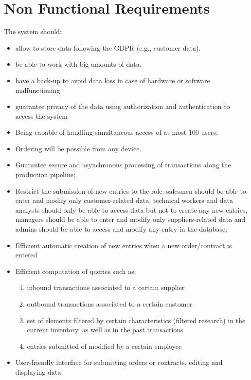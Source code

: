 \section{Non Functional Requirements}
The system should:
\begin{itemize}
    \item allow to store data following the GDPR (e.g., customer data).
    \item be able to work with big amounts of data.
    \item have a back-up to avoid data loss in case of hardware or software malfunctioning
    \item guarantee privacy of the data using authorization and authentication to access the system
    \item Being capable of handling simultaneous access of at most 100 users;
    \item Ordering will be possible from any device.
    \item Guarantee secure and asynchronous processing of transactions along the production pipeline;
    \item Restrict the submission of new entries to the role: salesmen should be able to enter and modify only customer-related data, technical workers and data analysts should only be able to access data but not to create any new entries, managers should be able to enter and modify only suppliers-related data and admins should be able to access and modify any entry in the database;
    \item Efficient automatic creation of new entries when a new order/contract is entered 
    \item Efficient computation of queries such as:
    \begin{enumerate}
    \item inbound transactions associated to a certain supplier
    \item outbound transactions associated to a certain customer
   \item set of elements filtered by certain characteristics (filtered research) in the current inventory, as well as in the past transactions
   \item entries submitted of modified by a certain employee
    \end{enumerate}
    \item User-friendly interface for submitting orders or contracts, editing and displaying data
\end{itemize}


